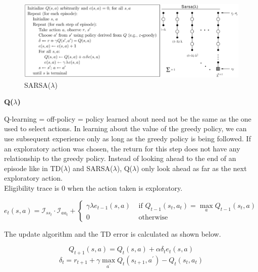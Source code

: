 \documentclass{article}
\begin{document}
\begin{figure}[h]
\includegraphics[scale=0.5]{sarsa_lambda}
\centering
\caption{SARSA($\lambda$)}
\end{figure}

\noindent
\textbf{Q($\lambda$)}

\noindent
Q-learning = off-policy = policy learned about need not be the same as the one
used to select actions. In learning about the value of the greedy policy, we can
use subsequent experience only as long as the greedy policy is being followed.
If an exploratory action was chosen, the return for this step does not have any
relationship to the greedy policy. Instead of looking ahead to the end of an
episode like in TD($\lambda$) and SARSA($\lambda$), Q($\lambda$) only look ahead
as far as the next exploratory action.\\

\noindent
Eligibility trace is 0 when the action taken is exploratory.

\begin{equation}
e_{t}(s, a)=\mathcal{I}_{s s_{t}} \cdot \mathcal{I}_{a a_{t}}+\left\{\begin{array}{ll}
\gamma \lambda e_{t-1}(s, a) & \text { if } Q_{t-1}\left(s_{t}, a_{t}\right)=\max _{a} Q_{t-1}\left(s_{t}, a\right) \\
0 & \text { otherwise }
\end{array}\right.
\end{equation}

\noindent
The update algorithm and the TD error is calculated as shown below.

\begin{equation}
Q_{t+1}(s, a)=Q_{t}(s, a)+\alpha \delta_{t} e_{t}(s, a)
\end{equation}
\begin{equation}
\delta_{t}=r_{t+1}+\gamma \max _{a^{\prime}} Q_{t}\left(s_{t+1}, a^{\prime}\right)-Q_{t}\left(s_{t}, a_{t}\right)
\end{equation}
\end{document}
